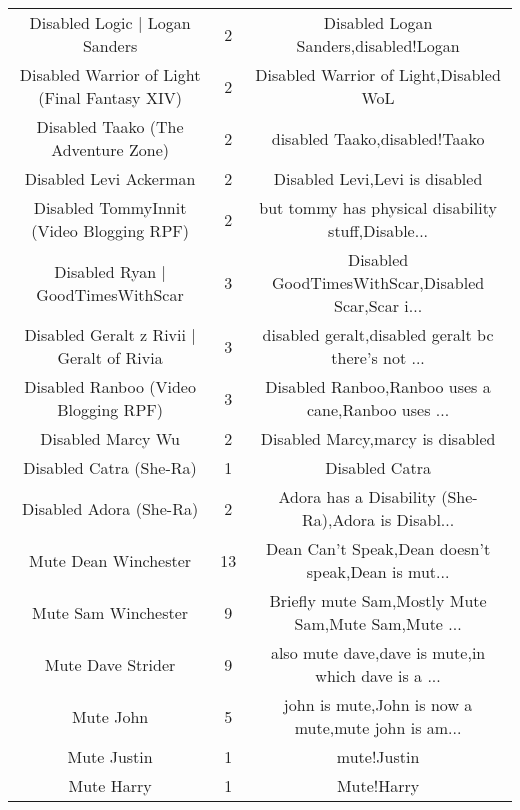 \begin{table}[h!]
{\begin{tabular}{|c|c|c|}
                    Disabled Logic | Logan Sanders &      2 &              Disabled Logan Sanders,disabled!Logan \\
     Disabled Warrior of Light (Final Fantasy XIV) &      2 &             Disabled Warrior of Light,Disabled WoL \\
               Disabled Taako (The Adventure Zone) &      2 &                      disabled Taako,disabled!Taako \\
                            Disabled Levi Ackerman &      2 &                     Disabled Levi,Levi is disabled \\
          Disabled TommyInnit (Video Blogging RPF) &      2 & but tommy has physical disability stuff,Disable... \\
                 Disabled Ryan | GoodTimesWithScar &      3 & Disabled GoodTimesWithScar,Disabled Scar,Scar i... \\
         Disabled Geralt z Rivii | Geralt of Rivia &      3 & disabled geralt,disabled geralt bc there's not ... \\
              Disabled Ranboo (Video Blogging RPF) &      3 & Disabled Ranboo,Ranboo uses a cane,Ranboo uses ... \\
                                 Disabled Marcy Wu &      2 &                   Disabled Marcy,marcy is disabled \\
                           Disabled Catra (She-Ra) &      1 &                                     Disabled Catra \\
                           Disabled Adora (She-Ra) &      2 & Adora has a Disability (She-Ra),Adora is Disabl... \\
                              Mute Dean Winchester &     13 & Dean Can't Speak,Dean doesn't speak,Dean is mut... \\
                               Mute Sam Winchester &      9 & Briefly mute Sam,Mostly Mute Sam,Mute Sam,Mute ... \\
                                 Mute Dave Strider &      9 & also mute dave,dave is mute,in which dave is a ... \\
                                         Mute John &      5 & john is mute,John is now a mute,mute john is am... \\
                                       Mute Justin &      1 &                                        mute!Justin \\
                                        Mute Harry &      1 &                                         Mute!Harry \\

\end{tabular}}
\end{table}

